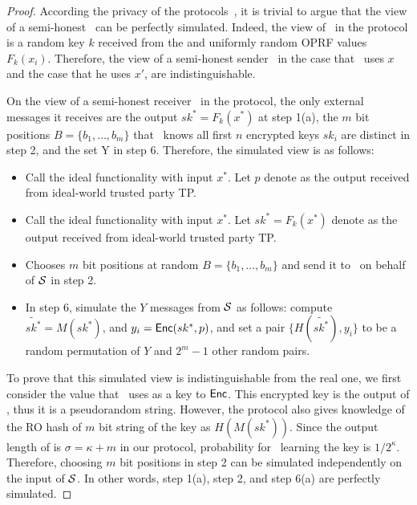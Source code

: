 \begin{proof}

\medskip
{} 
According the privacy of the \batchOPRF protocols~\cite{CCS:KKRT16}, it is trivial to argue that the view of a semi-honest \SS\ can be perfectly simulated. Indeed, the view of \SS\ in the protocol is a random key $k$ received from the \batchOPRF and uniformly random OPRF values $F_k(x_i)$. Therefore, the view of a semi-honest sender \SS\, in the case that \RR\  uses $x$ and the case that he uses  $x'$, are indistinguishable. 

\medskip
{} On the view of a semi-honest receiver \RR\ in the protocol, the only external messages it receives are the \batchOPRF output $sk^*=F_k(x^*)$ at step 1(a), the $m$ bit positions $B=\{b_1,  \ldots, b_m\}$ that \RR\ knows all first $n$ encrypted keys $sk_i$ are distinct in step 2, and the set Y in step 6. Therefore, the simulated view is as follows:
 \begin{itemize}
 	\item Call the ideal \SSOT functionality with input $x^*$. Let $p$ denote as the output received from ideal-world trusted party TP.
 	
 	\item Call the ideal \batchOPRF functionality with input $x^*$. Let $sk^*=F_k(x^*)$ denote as the output received from ideal-world trusted party TP.
 	
 	
 	\item Chooses $m$ bit positions at random $B=\{b_1,  \ldots, b_m\}$ and send it to \RR\ on behalf of $\mathcal{S}$ in step 2.
 	
 	\item In step 6, simulate the $Y$ messages from $\mathcal{S}$ as follows:
 	compute  $\tilde{sk^*} = M( sk^*)$, and $y_i = \mathsf{Enc}( sk^*, p)$, and set a pair $\{H(\tilde{sk^*}), y_i \}$ to be a random permutation of $Y$ and $2^m-1$ other random pairs.
 	
 \end{itemize}

To prove that this simulated view is indistinguishable from the real one, we first consider the value that \SS\ uses as a key to $\mathsf{Enc}$. This encrypted key is the output of \batchOPRF, thus it is a pseudorandom string. However, the protocol also gives knowledge of the RO hash of $m$ bit string of the key as $H(M( sk^*))$. Since the output length of \batchOPRF is $\sigma=\kappa+m$ in our protocol, probability for \RR\ learning the key is $1/2^\kappa$. Therefore, choosing $m$ bit positions in step 2 can be simulated independently on the input of $\mathcal{S}$. In other words, step 1(a), step 2, and step 6(a) are perfectly simulated.


\end{proof}
